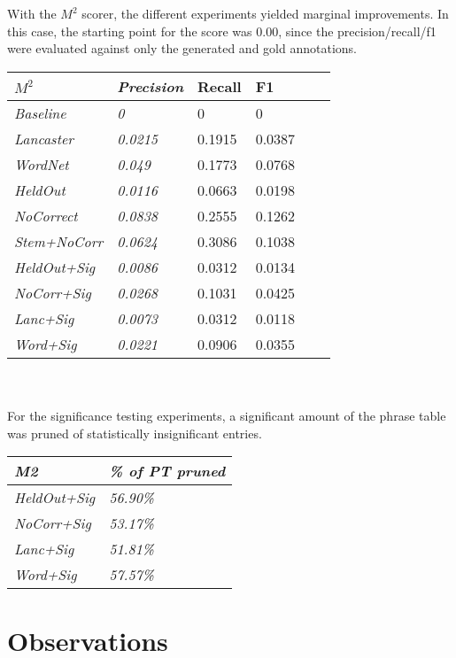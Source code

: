 \documentclass[11pt,letterpaper]{article}
\begin{document}
With the $M^2$ scorer, the different experiments yielded marginal improvements. In this case, the starting point for the score was 0.00, since the precision/recall/f1 were evaluated against only the generated and gold annotations. \\

\begin{tabular}{ |l|l|l|l|l|l| }
\hline
\textit{$M^2$} & \textit{Precision} & Recall & F1 \\ \hline
\textit{Baseline} & \textit{0} & 0 & 0 \\ \hline
\textit{Lancaster} & \textit{0.0215} & 0.1915 & 0.0387 \\ \hline
\textit{WordNet} & \textit{0.049} & 0.1773 & 0.0768 \\ \hline
\textit{HeldOut} & \textit{0.0116} & 0.0663 & 0.0198 \\ \hline
\textit{NoCorrect} & \textit{0.0838} & 0.2555 & 0.1262 \\ \hline
\textit{Stem+NoCorr} & \textit{0.0624} & 0.3086 & 0.1038 \\ \hline
\textit{HeldOut+Sig} & \textit{0.0086} & 0.0312 & 0.0134 \\ \hline
\textit{NoCorr+Sig} & \textit{0.0268} & 0.1031 & 0.0425 \\ \hline
\textit{Lanc+Sig} & \textit{0.0073} & 0.0312 & 0.0118 \\ \hline
\textit{Word+Sig} & \textit{0.0221} & 0.0906 & 0.0355 \\ \hline
\end{tabular}
\\\\

For the significance testing experiments, a significant amount of the phrase table was pruned of statistically insignificant entries. \\

\begin{tabular}{|l|l|}
\hline
\textit{M2} & \textit{\% of PT pruned} \\ \hline
\textit{HeldOut+Sig} & \textit{56.90\%} \\ \hline
\textit{NoCorr+Sig} & \textit{53.17\%} \\ \hline
\textit{Lanc+Sig} & \textit{51.81\%} \\ \hline
\textit{Word+Sig} & \textit{57.57\%} \\ \hline
\end{tabular}

\section{Observations}
\end{document}
